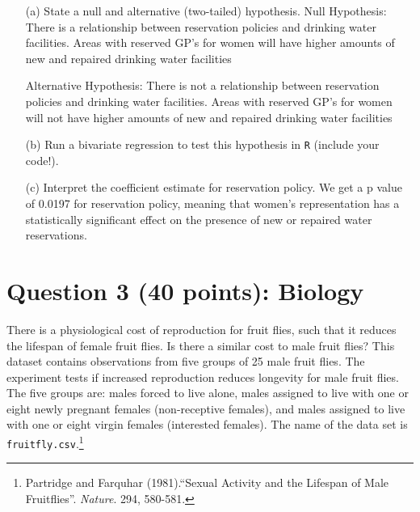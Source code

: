 \documentclass[12pt,letterpaper]{article}
\begin{document}
	\newpage
	\begin{enumerate}
		\item [(a)] State a null and alternative (two-tailed) hypothesis. 
		\vspace{1cm}
		Null Hypothesis: There is a relationship between reservation policies and drinking water facilities. Areas with reserved GP's for women will have higher amounts of new and repaired drinking water facilities 
		
		Alternative Hypothesis: There is not a relationship between reservation policies and drinking water facilities. Areas with reserved GP's for women will not have higher amounts of new and repaired drinking water facilities 
		
		\vspace{2cm}
		\item [(b)] Run a bivariate regression to test this hypothesis in \texttt{R} (include your code!).
		\vspace{1cm}
		  
		\vspace*{1cm}
		
		
		\vspace{2cm}
		\item [(c)] Interpret the coefficient estimate for reservation policy. 
		\vspace{1cm}
		We get a p value of 0.0197 for reservation policy, meaning that women's representation has a statistically significant effect on the presence of new or repaired water reservations.  

	\end{enumerate}
	
	\newpage
	\section*{Question 3 (40 points): Biology}
	
	There is a physiological cost of reproduction for fruit flies, such that it reduces the lifespan of female fruit flies.  Is there a similar cost to male fruit flies?  This dataset contains observations from five groups of 25 male fruit flies. The experiment tests if increased reproduction reduces longevity for male fruit flies. The five groups are: males forced to live alone, males assigned to live with one or eight newly pregnant females (non-receptive females), and males assigned to live with one or eight virgin females (interested females). The name of the data set is \texttt{fruitfly.csv}.\footnote{Partridge and Farquhar (1981).``Sexual Activity and the Lifespan of Male Fruitflies''. \textit{Nature}. 294, 580-581.}
	\vspace{1cm}
	
\end{document}
